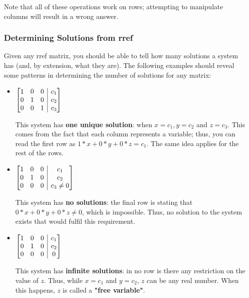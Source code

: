 \documentclass[12pt]{article}
\begin{document}
Note that all of these operations work on rows; attempting to manipulate columns will result in a wrong answer. 

\subsubsection{Determining Solutions from rref}

Given any rref matrix, you should be able to tell how many solutions a system has (and, by extension, what they are). The following examples should reveal some patterns in determining the number of solutions for any matrix:

\begin{itemize}
    \item 
    $
    \begin{array}[t][{@{}ccc|c@{}}]
     1 & 0 & 0 & c_1 \\
     0 & 1 & 0 & c_2 \\
     0 & 0 & 1 & c_3 \\
    \end{array}\
    $
    
    This system has \textbf{one unique solution}: when $x = c_1, y = c_2$ and $z = c_3$. This comes from the fact that each column represents a variable; thus, you can read the first row as $1*x+0*y+0*z = c_1$. The same idea applies for the rest of the rows.
    \item 
    $
    \begin{array}[t][{@{}ccc|c@{}}]
     1 & 0 & 0 & c_1 \\
     0 & 1 & 0 & c_2 \\
     0 & 0 & 0 & c_3 \neq 0 \\
    \end{array}\
    $
    
    This system has \textbf{no solutions}: the final row is stating that $0*x+0*y+0*z \neq 0$, which is impossible. Thus, no solution to the system exists that would fulfil this requirement.
    \item 
    $
    \begin{array}[t][{@{}ccc|c@{}}]
     1 & 0 & 0 & c_1 \\
     0 & 1 & 0 & c_2 \\
     0 & 0 & 0 & 0 \\
    \end{array}\
    $
    
    This system has \textbf{infinite solutions}: in no row is there any restriction on the value of $z$. Thus, while $x = c_1$ and $y = c_2$, $z$ can be any real number. When this happens, $z$ is called a \textbf{"free variable"}. 
     

\end{itemize}
\end{document}
